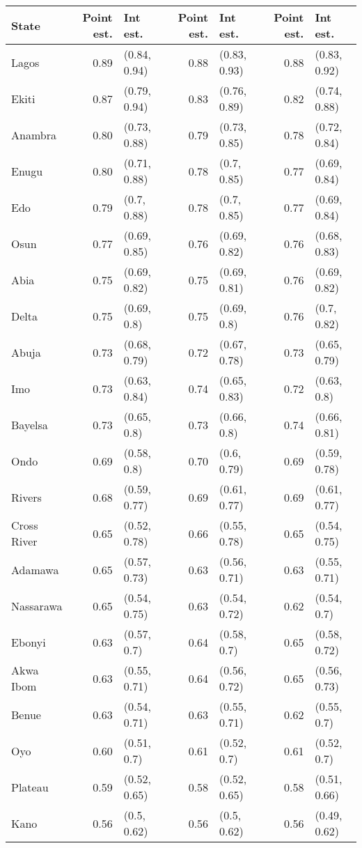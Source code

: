 
\begin{tabular}{lrlrlrl}
\toprule
State & Point est. & Int est. & Point est. & Int est. & Point est. & Int est.\\
\midrule
Lagos & 0.89 & (0.84, 0.94) & 0.88 & (0.83, 0.93) & 0.88 & (0.83, 0.92)\\
Ekiti & 0.87 & (0.79, 0.94) & 0.83 & (0.76, 0.89) & 0.82 & (0.74, 0.88)\\
Anambra & 0.80 & (0.73, 0.88) & 0.79 & (0.73, 0.85) & 0.78 & (0.72, 0.84)\\
Enugu & 0.80 & (0.71, 0.88) & 0.78 & (0.7, 0.85) & 0.77 & (0.69, 0.84)\\
Edo & 0.79 & (0.7, 0.88) & 0.78 & (0.7, 0.85) & 0.77 & (0.69, 0.84)\\
Osun & 0.77 & (0.69, 0.85) & 0.76 & (0.69, 0.82) & 0.76 & (0.68, 0.83)\\
Abia & 0.75 & (0.69, 0.82) & 0.75 & (0.69, 0.81) & 0.76 & (0.69, 0.82)\\
Delta & 0.75 & (0.69, 0.8) & 0.75 & (0.69, 0.8) & 0.76 & (0.7, 0.82)\\
Abuja & 0.73 & (0.68, 0.79) & 0.72 & (0.67, 0.78) & 0.73 & (0.65, 0.79)\\
Imo & 0.73 & (0.63, 0.84) & 0.74 & (0.65, 0.83) & 0.72 & (0.63, 0.8)\\
Bayelsa & 0.73 & (0.65, 0.8) & 0.73 & (0.66, 0.8) & 0.74 & (0.66, 0.81)\\
Ondo & 0.69 & (0.58, 0.8) & 0.70 & (0.6, 0.79) & 0.69 & (0.59, 0.78)\\
Rivers & 0.68 & (0.59, 0.77) & 0.69 & (0.61, 0.77) & 0.69 & (0.61, 0.77)\\
Cross River & 0.65 & (0.52, 0.78) & 0.66 & (0.55, 0.78) & 0.65 & (0.54, 0.75)\\
Adamawa & 0.65 & (0.57, 0.73) & 0.63 & (0.56, 0.71) & 0.63 & (0.55, 0.71)\\
Nassarawa & 0.65 & (0.54, 0.75) & 0.63 & (0.54, 0.72) & 0.62 & (0.54, 0.7)\\
Ebonyi & 0.63 & (0.57, 0.7) & 0.64 & (0.58, 0.7) & 0.65 & (0.58, 0.72)\\
Akwa Ibom & 0.63 & (0.55, 0.71) & 0.64 & (0.56, 0.72) & 0.65 & (0.56, 0.73)\\
Benue & 0.63 & (0.54, 0.71) & 0.63 & (0.55, 0.71) & 0.62 & (0.55, 0.7)\\
Oyo & 0.60 & (0.51, 0.7) & 0.61 & (0.52, 0.7) & 0.61 & (0.52, 0.7)\\
Plateau & 0.59 & (0.52, 0.65) & 0.58 & (0.52, 0.65) & 0.58 & (0.51, 0.66)\\
Kano & 0.56 & (0.5, 0.62) & 0.56 & (0.5, 0.62) & 0.56 & (0.49, 0.62)\\

\end{tabular}
